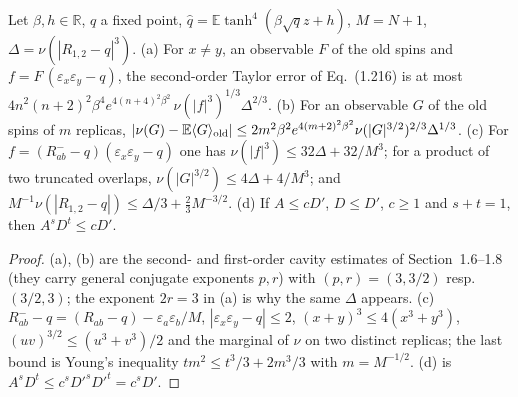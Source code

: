 \begin{theorem}
\label{thm:sg-tal:holder-three}
  \leanok
{}
Let $\beta,h\in\mathbb R$, $q$ a fixed point, $\hat q=\mathbb E\tanh^4(\beta\sqrt qz+h)$, $M=N+1$, $\Delta=\nu(|R_{1,2}-q|^3)$.
(a) For $x\ne y$, an observable $F$ of the old spins and $f=F\,(\varepsilon_x\varepsilon_y-q)$, the second-order Taylor
error of Eq.~(1.216) is at most $4n^2(n+2)^2\beta^4e^{4(n+4)^2\beta^2}\,\nu(|f|^3)^{1/3}\Delta^{2/3}$.
(b) For an observable $G$ of the old spins of $m$ replicas, $|\nu(G)-\mathbb E\langle G\rangle_{\rm old}|\le 2m^2\beta^2e^{4(m+2)^2\beta^2}\nu(|G|^{3/2})^{2/3}\Delta^{1/3}$.
(c) For $f=(R^-_{ab}-q)(\varepsilon_x\varepsilon_y-q)$ one has $\nu(|f|^3)\le32\Delta+32/M^3$; for a product of two truncated overlaps,
$\nu(|G|^{3/2})\le4\Delta+4/M^3$; and $M^{-1}\nu(|R_{1,2}-q|)\le\Delta/3+\frac23M^{-3/2}$.
(d) If $A\le cD'$, $D\le D'$, $c\ge1$ and $s+t=1$, then $A^sD^t\le cD'$.
\end{theorem}
\begin{proof}
  \leanok
(a), (b) are the second- and first-order cavity estimates of Section~1.6--1.8 (they carry general conjugate exponents $p,r$)
with $(p,r)=(3,3/2)$ resp.\ $(3/2,3)$; the exponent $2r=3$ in (a) is why the same $\Delta$ appears.
(c) $R^-_{ab}-q=(R_{ab}-q)-\varepsilon_a\varepsilon_b/M$, $|\varepsilon_x\varepsilon_y-q|\le2$, $(x+y)^3\le4(x^3+y^3)$,
$(uv)^{3/2}\le(u^3+v^3)/2$ and the marginal of $\nu$ on two distinct replicas; the last bound is Young's inequality
$tm^2\le t^3/3+2m^3/3$ with $m=M^{-1/2}$.  (d) is $A^sD^t\le c^sD'^s D'^t=c^sD'$.
\end{proof}

